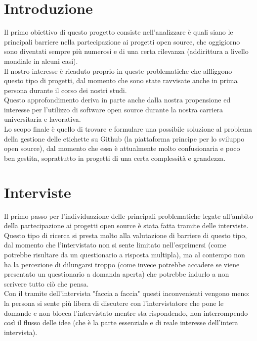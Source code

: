 \documentclass[12pt]{article} %
\begin{document}
\section{Introduzione}
Il primo obiettivo di questo progetto consiste nell'analizzare è quali siano le principali barriere nella partecipazione ai progetti open source, che oggigiorno sono diventati sempre più numerosi e di una certa rilevanza (addirittura a livello mondiale in alcuni casi).\\
Il nostro interesse è ricaduto proprio in queste problematiche che affliggono questo tipo di progetti, dal momento che sono state ravvisate anche in prima persona durante il corso dei nostri studi.\\
Questo approfondimento deriva in parte anche dalla nostra propensione ed interesse per l'utilizzo di software open source durante la nostra carriera universitaria e lavorativa.\\
Lo scopo finale è quello di trovare e formulare una possibile soluzione al problema della gestione delle etichette su Github (la piattaforma principe per lo sviluppo open source), dal momento che essa è attualmente molto confusionaria e poco ben gestita, soprattutto in progetti di una certa complessità e grandezza.
\newpage

\section{Interviste}
Il primo passo per l'individuazione delle principali problematiche legate all'ambito della partecipazione ai progetti open source è stata fatta tramite delle interviste. Questo tipo di ricerca si presta molto alla valutazione di barriere di questo tipo, dal momento che l'intervistato non si sente limitato nell'esprimersi (come potrebbe risultare da un questionario a risposta multipla), ma al contempo non ha la percezione di dilungarsi troppo (come invece potrebbe accadere se viene presentato un questionario a domanda aperta) che potrebbe indurlo a non scrivere tutto ciò che pensa.\\
Con il tramite dell'intervista "faccia a faccia" questi inconvenienti vengono meno: la persona si sente più libera di discutere con l'intervistatore che pone le domande e non blocca l'intervistato mentre sta rispondendo, non interrompendo così il flusso delle idee (che è la parte essenziale e di reale interesse dell'intera intervista).\\
\end{document}
